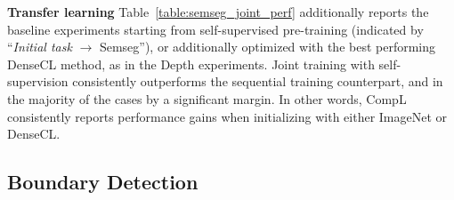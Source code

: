 \documentclass[10pt,twocolumn,letterpaper]{article}
\newcommand{\parsection}[1]{\vspace{1mm}\noindent\textbf{#1 }}
\begin{document}
\begin{table}[t!]
  \center
  \caption{Boundary detection performance in ODS F-score on the BSDS500 dataset. `$\rightarrow$' denote transfer learning methods, while `+' denotes joint training. Performance improvements are marginal, in contrast to the findings for other target tasks.}
  \vspace{-0.1in}
\label{table:edge_joint_perf}
\vspace{-0.2in}
\end{table}


\parsection{Transfer learning}
Table~\ref{table:semseg_joint_perf} additionally reports the baseline experiments starting from self-supervised pre-training (indicated by ``\emph{Initial task} $\rightarrow$ Semseg''), or additionally optimized with the best performing DenseCL method, as in the Depth experiments.
Joint training with self-supervision consistently outperforms the sequential training counterpart, and in the majority of the cases by a significant margin.
In other words, CompL consistently reports performance gains when initializing with either ImageNet or DenseCL.



\subsection{Boundary Detection}
\end{document}
